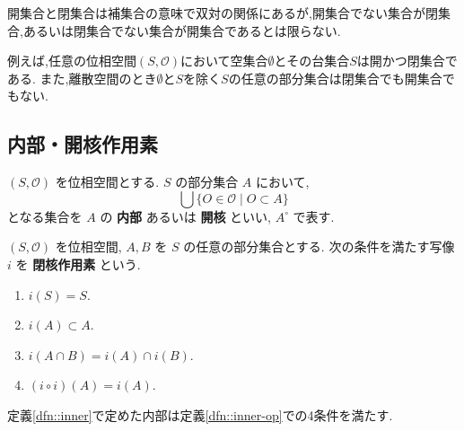 \begin{rem*}
    開集合と閉集合は補集合の意味で双対の関係にあるが,開集合でない集合が閉集合,あるいは閉集合でない集合が開集合であるとは限らない.

    例えば,任意の位相空間$(S,\mathcal{O})$において空集合$\emptyset$とその台集合$S$は開かつ閉集合である.
    また,離散空間のとき$\emptyset$と$S$を除く$S$の任意の部分集合は閉集合でも開集合でもない.
\end{rem*}

\subsection{内部・開核作用素}

\begin{framed}
    \begin{dfn}[]\label{dfn::inner}
        $(S,\mathcal{O})$ を位相空間とする. $S$ の部分集合 $A$ において, $$\bigcup\{O\in\mathcal{O} \mid O\subset A\}$$ となる集合を $A$ の \textbf{内部} あるいは \textbf{開核} といい, $A^\circ$ で表す.
    \end{dfn}
\end{framed}


\begin{framed}
    \begin{dfn}[]\label{dfn::inner-op}
        $(S,\mathcal{O})$ を位相空間, $A,B$ を $S$ の任意の部分集合とする. 次の条件を満たす写像 $i$ を \textbf{閉核作用素} という.

        \begin{enumerate}
            \item $i(S)=S.$
            \item $i(A)\subset A.$
            \item $i(A\cap B)=i(A)\cap i(B).$
            \item $(i\circ i)(A)=i(A).$
        \end{enumerate}
    \end{dfn}
\end{framed}

\begin{framed}
    \begin{thm}[]\label{thm::inner-op}
        定義\ref{dfn::inner}で定めた内部は定義\ref{dfn::inner-op}での4条件を満たす.
    \end{thm}
\end{framed}



